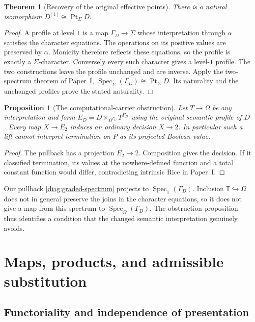 \documentclass[11pt,a4paper]{article}
\numberwithin{equation}{section}
\newtheorem{theorem}{Theorem}[section]
\newtheorem{proposition}[proposition]{Proposition}
\theoremstyle{definition}
\theoremstyle{remark}
\theoremstyle{plain}
\newcommand{\TV}{\mathbb T}
\newcommand{\Pt}{\operatorname{Pt}_{\Sigma}}
\newcommand{\Spec}{\operatorname{Spec}}
\newcommand{\incl}{\hookrightarrow}
\begin{document}
\begin{theorem}[Recovery of the original effective points]
\label{thm:base-recovery}
There is a natural isomorphism $D^{[1]}\cong\Pt D$.
\end{theorem}
\begin{proof}
A profile at level $1$ is a map $\Gamma_D\to\Sigma$ whose
interpretation through $\alpha$ satisfies the character equations.
The operations on its positive values are preserved by $\alpha$.
Monicity therefore reflects these equations, so the profile is exactly
a $\Sigma$-character. Conversely every such character gives a level-$1$
profile. The two constructions leave the profile unchanged and are
inverse. Apply the two-spectrum theorem of Paper~I,
$\Spec_\Sigma(\Gamma_D)\cong\Pt D$. Its naturality and the unchanged
profiles prove the stated naturality.
\end{proof}

\begin{proposition}[The computational-carrier obstruction]
\label{prop:computational-carrier-obstruction}
Let $T\to\Omega$ be any interpretation and form
$E_D=D\times_{\Omega^{\Gamma_D}}T^{\Gamma_D}$ using the original
semantic profile of $D$. Every map $X\to E_2$ induces an ordinary
decision $X\to2$. In particular such a lift cannot interpret
termination on $P$ as its projected Boolean value.
\end{proposition}
\begin{proof}
The pullback has a projection $E_2\to2$. Composition gives the
decision. If it classified termination, its values at the
nowhere-defined function and a total constant function would differ,
contradicting intrinsic Rice in Paper~I.
\end{proof}

Our pullback \eqref{diag:graded-spectrum} projects to
$\Spec_{\TV}(\Gamma_D)$. Inclusion $\TV\incl\Omega$ does not in
general preserve the joins in the character equations, so it does not
give a map from this spectrum to $\Spec_\Omega(\Gamma_D)$.
The obstruction proposition thus identifies a condition that the
changed semantic interpretation genuinely avoids.

\section{Maps, products, and admissible substitution}
\label{sec:maps}

\subsection{Functoriality and independence of presentation}
\end{document}
